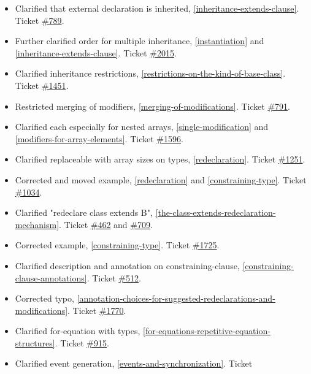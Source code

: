 \documentclass[10pt,a4paper]{report}
\begin{document}
\begin{itemize}
\item
  Clarified that external declaration is inherited, \ref{inheritance-extends-clause}. Ticket
  \href{https://trac.modelica.org/Modelica/ticket/789}{\#789}.
\item
  Further clarified order for multiple inheritance, \ref{instantiation} and
  \ref{inheritance-extends-clause}. Ticket
  \href{https://trac.modelica.org/Modelica/ticket/2015}{\#2015}.
\item
  Clarified inheritance restrictions, \ref{restrictions-on-the-kind-of-base-class}. Ticket
  \href{https://trac.modelica.org/Modelica/ticket/1451}{\#1451}.
\item
  Restricted merging of modifiers, \ref{merging-of-modifications}. Ticket
  \href{https://trac.modelica.org/Modelica/ticket/791}{\#791}.
\item
  Clarified each especially for nested arrays, \ref{single-modification} and \ref{modifiers-for-array-elements}.
  Ticket \href{https://trac.modelica.org/Modelica/ticket/1596}{\#1596}.
\item
  Clarified replaceable with array sizes on types, \ref{redeclaration}. Ticket
  \href{https://trac.modelica.org/Modelica/ticket/1251}{\#1251}.
\item
  Corrected and moved example, \ref{redeclaration} and \ref{constraining-type}. Ticket
  \href{https://trac.modelica.org/Modelica/ticket/1034}{\#1034}.
\item
  Clarified "redeclare class extends B", \ref{the-class-extends-redeclaration-mechanism}. Ticket
  \href{https://trac.modelica.org/Modelica/ticket/462}{\#462} and
  \href{https://trac.modelica.org/Modelica/ticket/709}{\#709}.
\item
  Corrected example, \ref{constraining-type}. Ticket
  \href{https://trac.modelica.org/Modelica/ticket/1725}{\#1725}.
\item
  Clarified description and annotation on constraining-clause, \ref{constraining-clause-annotations}. Ticket
  \href{https://trac.modelica.org/Modelica/ticket/512}{\#512}.
\item
  Corrected typo, \ref{annotation-choices-for-suggested-redeclarations-and-modifications}. Ticket
  \href{https://trac.modelica.org/Modelica/ticket/1770}{\#1770}.
\item
  Clarified for-equation with types, \ref{for-equations-repetitive-equation-structures}. Ticket
  \href{https://trac.modelica.org/Modelica/ticket/915}{\#915}.
\item
  Clarified event generation, \ref{events-and-synchronization}. Ticket

\end{itemize}
\end{document}
